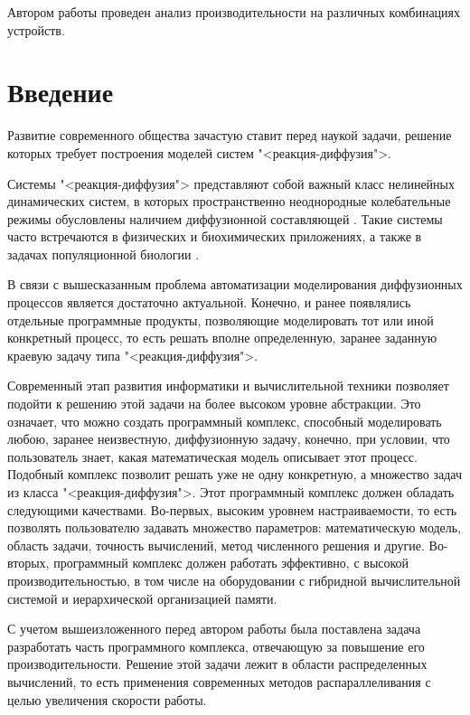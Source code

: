 \documentclass[a4paper, 14pt]{extarticle}
\theoremstyle{definition}
\begin{document}
\par Автором работы проведен анализ производительности на различных комбинациях устройств.




\tableofcontents





\section*{Введение}

\par Развитие современного общества зачастую ставит перед наукой задачи, решение которых требует построения моделей систем "<реакция-диффузия">.

\par Системы "<реакция-диффузия"> представляют собой важный класс нелинейных динамических систем, в которых пространственно неоднородные колебательные режимы обусловлены наличием диффузионной составляющей \cite{GlyzinSD_1}. Такие системы часто встречаются в физических и биохимических приложениях, а также в задачах популяционной биологии \cite{GlyzinSD_2}.

\par В связи с вышесказанным проблема автоматизации моделирования диффузионных процессов является достаточно актуальной. Конечно, и ранее появлялись отдельные программные продукты, позволяющие моделировать тот или иной конкретный процесс, то есть решать вполне определенную, заранее заданную краевую задачу типа "<реакция-диффузия">.

\par Современный этап развития информатики и вычислительной техники позволяет подойти к решению этой задачи на более высоком уровне абстракции. Это означает, что можно создать программный комплекс, способный моделировать любою, заранее неизвестную, диффузионную задачу, конечно, при условии, что пользователь знает, какая математическая модель описывает этот процесс. Подобный комплекс позволит решать уже не одну конкретную, а множество задач из класса "<реакция-диффузия">. Этот программный комплекс должен обладать следующими качествами. Во-первых, высоким уровнем настраиваемости, то есть позволять пользователю задавать множество параметров: математическую модель, область задачи, точность вычислений, метод численного решения и другие. Во-вторых, программный комплекс должен работать эффективно, с высокой производительностью, в том числе на оборудовании с гибридной вычислительной системой и иерархической организацией памяти.
\par С учетом вышеизложенного перед автором работы была поставлена задача разработать часть программного комплекса, отвечающую за повышение его производительности. Решение этой задачи лежит в области распределенных вычислений, то есть применения современных методов распараллеливания с целью увеличения скорости работы.%
\end{document}
